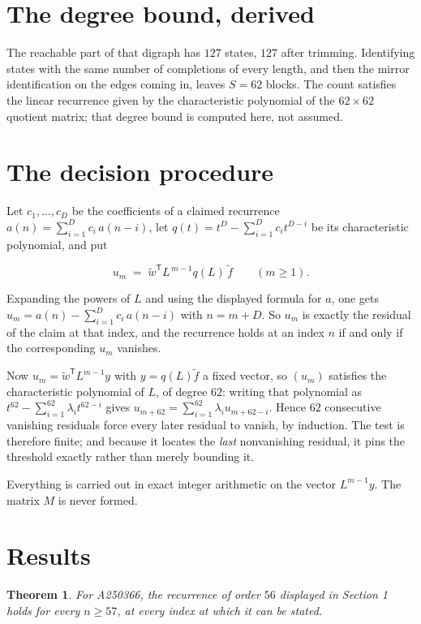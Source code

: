\documentclass[11pt]{article}
\newtheorem{theorem}{Theorem}
\theoremstyle{definition}
\begin{document}
\section{The degree bound, derived}

The reachable part of that digraph has $127$ states, $127$ after trimming. Identifying states with the same number of completions of every length, and then the mirror identification on the edges coming in, leaves $S = 62$ blocks. The count satisfies the linear recurrence given by the characteristic polynomial of the $62\times62$ quotient matrix; that degree bound is computed here, not assumed.

\section{The decision procedure}

Let $c_1,\dots,c_D$ be the coefficients of a claimed recurrence $a(n) = \sum_{i=1}^{D} c_i\,a(n-i)$, let $q(t) = t^{D} - \sum_{i=1}^{D} c_i t^{D-i}$ be its characteristic polynomial, and put

\[u_m \;=\; \tilde w^{\mathsf T} L^{\,m-1} q(L)\,\tilde f \qquad (m \ge 1).\]

Expanding the powers of $L$ and using the displayed formula for $a$, one gets $u_m = a(n) - \sum_{i=1}^{D} c_i\,a(n-i)$ with $n = m + D$. So $u_m$ is exactly the residual of the claim at that index, and the recurrence holds at an index $n$ if and only if the corresponding $u_m$ vanishes.

Now $u_m = \tilde w^{\mathsf T} L^{m-1} y$ with $y = q(L)\tilde f$ a fixed vector, so $(u_m)$ satisfies the characteristic polynomial of $L$, of degree $62$: writing that polynomial as $t^{62} - \sum_{i=1}^{62} \lambda_i t^{62-i}$ gives $u_{m+62} = \sum_{i=1}^{62} \lambda_i u_{m+62-i}$. Hence $62$ consecutive vanishing residuals force every later residual to vanish, by induction. The test is therefore finite; and because it locates the {\itshape last} nonvanishing residual, it pins the threshold exactly rather than merely bounding it.

Everything is carried out in exact integer arithmetic on the vector $L^{m-1}y$. The matrix $M$ is never formed.

\section{Results}

\begin{theorem} For A250366, the recurrence of order $56$ displayed in Section 1 holds for every $n \ge 57$, at every index at which it can be stated.\end{theorem}
\end{document}
